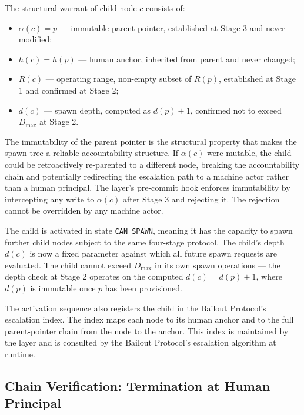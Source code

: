 The structural warrant of child node $c$ consists of:

\begin{itemize}\itemsep=0pt
\item $\alpha(c) = p$ — immutable parent pointer, established at Stage 3 and never modified;
\item $h(c) = h(p)$ — human anchor, inherited from parent and never changed;
\item $R(c)$ — operating range, non-empty subset of $R(p)$, established at Stage 1 and confirmed at Stage 2;
\item $d(c)$ — spawn depth, computed as $d(p) + 1$, confirmed not to exceed $D_{\max}$ at Stage 2.
\end{itemize}

The immutability of the parent pointer is the structural property that makes the spawn tree a reliable accountability structure. If $\alpha(c)$ were mutable, the child could be retroactively re-parented to a different node, breaking the accountability chain and potentially redirecting the escalation path to a machine actor rather than a human principal. The \fact{} layer's pre-commit hook enforces immutability by intercepting any write to $\alpha(c)$ after Stage 3 and rejecting it. The rejection cannot be overridden by any machine actor.

The child is activated in state \texttt{CAN\_SPAWN}, meaning it has the capacity to spawn further child nodes subject to the same four-stage protocol. The child's depth $d(c)$ is now a fixed parameter against which all future spawn requests are evaluated. The child cannot exceed $D_{\max}$ in its own spawn operations — the depth check at Stage 2 operates on the computed $d(c) = d(p) + 1$, where $d(p)$ is immutable once $p$ has been provisioned.

The activation sequence also registers the child in the Bailout Protocol's escalation index. The index maps each node to its human anchor and to the full parent-pointer chain from the node to the anchor. This index is maintained by the \fact{} layer and is consulted by the Bailout Protocol's escalation algorithm at runtime.

\subsection{Chain Verification: Termination at Human Principal}
\label{sec:rsp-chain-verification}

